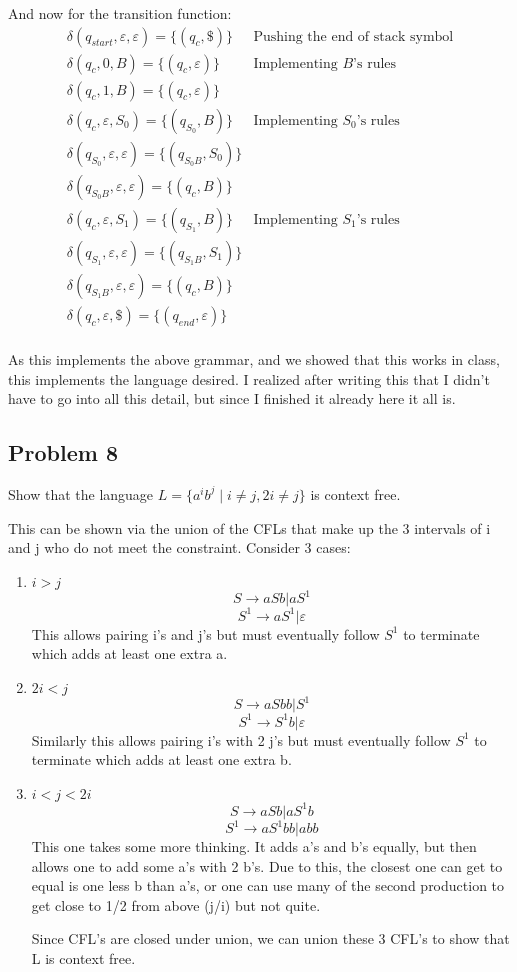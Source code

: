 \documentclass[english]{article}
\begin{document}
And now for the transition function:
\begin{align*}
\delta(q_{start},\varepsilon,\varepsilon) = \{(q_{c},\$)\} & \textrm{Pushing the end of stack symbol} \\
\delta(q_{c},0,B) = \{(q_{c},\varepsilon)\} & \textrm{Implementing $B$'s rules} \\
\delta(q_{c},1,B) = \{(q_{c},\varepsilon)\}  \\
\delta(q_{c},\varepsilon,S_0) = \{(q_{S_0},B)\} & \textrm{Implementing $S_0$'s rules} \\
\delta(q_{S_0},\varepsilon,\varepsilon) = \{(q_{S_0B},S_0)\}  \\
\delta(q_{S_0B},\varepsilon,\varepsilon) = \{(q_{c},B)\}  \\
\delta(q_{c},\varepsilon,S_1) = \{(q_{S_1},B)\} & \textrm{Implementing $S_1$'s rules} \\
\delta(q_{S_1},\varepsilon,\varepsilon) = \{(q_{S_1B},S_1)\}  \\
\delta(q_{S_1B},\varepsilon,\varepsilon) = \{(q_{c},B)\}  \\
\delta(q_{c},\varepsilon,\$) = \{(q_{end},\varepsilon)\}  \\
\end{align*}

As this implements the above grammar, and we showed that this works in class, this implements the language
desired. I realized after writing this that I didn't have to go into all this detail, but since I finished
it already here it all is.

\subsection*{Problem 8}
Show that the language \(L = \{a^i b^j \mid i \neq j, 2i \neq j\}\) is context free.

This can be shown via the union of the CFLs that make up the 3 intervals of i and j who do not meet the constraint. Consider 3 cases:
\begin{enumerate}
\item \(i > j\)
\[ S \rightarrow aSb | aS^1 \]
\[ S^1 \rightarrow aS^1 | \varepsilon \]
This allows pairing i's and j's but must eventually follow $S^1$ to terminate which adds at least one extra a.

\item \(2i < j\)
\[ S \rightarrow aSbb | S^1 \]
\[ S^1 \rightarrow S^1b | \varepsilon \]
Similarly this allows pairing i's with 2 j's but must eventually follow $S^1$ to terminate which adds at least one extra b.

\item \(i < j < 2i\)
\[ S \rightarrow  aSb | aS^1b \]
\[ S^1 \rightarrow  aS^1bb | abb \]
This one takes some more thinking. It adds a's and b's equally, but then allows one to add some a's with 2 b's. Due to this, the closest one can get to equal is one less b than a's, or one can use many of the second production to get close to 1/2 from above (j/i) but not quite.

Since CFL's are closed under union, we can union these 3 CFL's to show that L is context free.

\end{enumerate}
\end{document}
